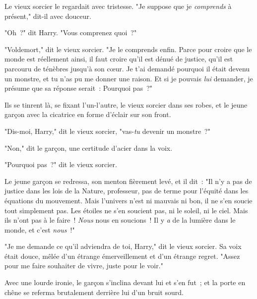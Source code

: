 Le vieux sorcier le regardait avec tristesse. "Je suppose que je \emph{comprends} à présent," dit-il avec douceur.

"Oh~?" dit Harry. "Vous comprenez quoi~?"

"Voldemort," dit le vieux sorcier. "Je le comprends enfin. Parce pour croire que le monde est réellement ainsi, il faut croire qu'il est dénué de justice, qu'il est parcouru de ténèbres jusqu'à son cœur. Je t'ai demandé pourquoi il était devenu un monstre, et tu n'as pu me donner une raison. Et si je pouvais \emph{lui} demander, je présume que sa réponse serait~: Pourquoi pas~?"

\later

Ils se tinrent là, se fixant l'un-l'autre, le vieux sorcier dans ses robes, et le jeune garçon avec la cicatrice en forme d'éclair sur son front.

"Dis-moi, Harry," dit le vieux sorcier, "vas-\emph{tu} devenir un monstre~?"

"Non," dit le garçon, une certitude d'acier dans la voix.

"Pourquoi pas~?" dit le vieux sorcier.

Le jeune garçon se redressa, son menton fièrement levé, et il dit~: "Il n'y a pas de justice dans les lois de la Nature, professeur, pas de terme pour l'équité dans les équations du mouvement. Mais l'univers n'est ni mauvais ni bon, il ne s'en soucie tout simplement pas. Les étoiles ne s'en soucient pas, ni le soleil, ni le ciel. Mais ils n'ont pas à le faire~! \emph{Nous} nous en soucions~! Il y \emph{a} de la lumière dans le monde, et c'est \emph{nous}~!"

"Je me demande ce qu'il adviendra de toi, Harry," dit le vieux sorcier. Sa voix était douce, mêlée d'un étrange émerveillement et d'un étrange regret. "Assez pour me faire souhaiter de vivre, juste pour le voir."

Avec une lourde ironie, le garçon s'inclina devant lui et s'en fut~; et la porte en chêne se referma brutalement derrière lui d'un bruit sourd. 

